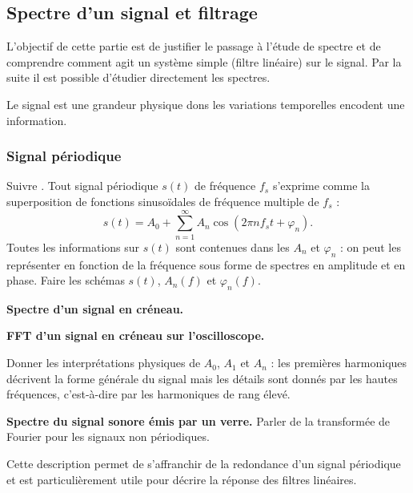 \subsection{Spectre d'un signal et filtrage}

\begin{remarque}
L'objectif de cette partie est de justifier le passage à l'étude de spectre et de comprendre comment agit un système simple (filtre linéaire) sur le signal.
Par la suite il est possible d'étudier directement les spectres.
\end{remarque}

Le signal est une grandeur physique dons les variations temporelles encodent une information.

\subsubsection{Signal périodique}

Suivre \cite{Salamito2017}.
Tout signal périodique $s(t)$ de fréquence $f_s$ s'exprime comme la superposition de fonctions sinusoïdales de fréquence multiple de $f_s$ :
\begin{equation}
s(t) = A_0 + \sum_{n=1}^\infty A_n \cos(2\pi n f_s t + \varphi_n).
\end{equation}
Toutes les informations sur $s(t)$ sont contenues dans les $A_n$ et $\varphi_n$ : on peut les représenter en fonction de la fréquence sous forme de spectres en amplitude et en phase.
Faire les schémas $s(t)$, $A_n(f)$ et $\varphi_n(f)$.

\begin{slide}
\textbf{Spectre d'un signal en créneau.}
\end{slide}

\begin{experience}
\textbf{FFT d'un signal en créneau sur l'oscilloscope.}
\end{experience}

Donner les interprétations physiques de $A_0$, $A_1$ et $A_n$ : les premières harmoniques décrivent la forme générale du signal mais les détails sont donnés par les hautes fréquences, c'est-à-dire par les harmoniques de rang élevé.

\begin{slide}
\textbf{Spectre du signal sonore émis par un verre.}
Parler de la transformée de Fourier pour les signaux non périodiques. 
\end{slide}

\begin{transition}
Cette description permet de s'affranchir de la redondance d'un signal périodique et est particulièrement utile pour décrire la réponse des filtres linéaires.
\end{transition}

